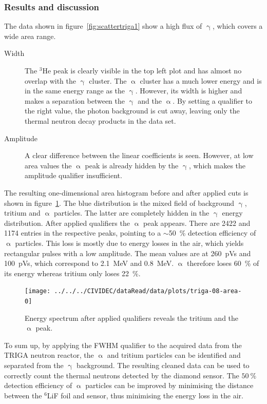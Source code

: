 \subsubsection{Results and discussion}
The data shown in figure~\ref{fig:scattertriga1} show a high flux of $\upgamma$, which covers a wide area range. 
\begin{description}
\item[Width] The $^3$He peak is clearly visible in the top left plot and has almost no overlap with the $\upgamma$ cluster. The $\upalpha$ cluster has a much lower energy and is in the same energy range as the $\upgamma$. However, its width is higher and makes a separation between the $\upgamma$ and the $\upalpha$. By setting a qualifier to the right value, the photon background is cut away, leaving only the thermal neutron decay products in the data set. 
\item[Amplitude] A clear difference between the linear coefficients is seen. However, at low area values the $\upalpha$ peak is already hidden by the $\upgamma$, which makes the amplitude qualifier insufficient.
\end{description}
The resulting one-dimensional area histogram before and after applied cuts is shown in figure~\ref{fig:areatriga0}. The blue distribution is the mixed field of background $\upgamma$, tritium and $\upalpha$ particles. The latter are completely hidden in the $\upgamma$ energy distribution. After applied qualifiers the $\upalpha$ peak appears. There are 2422 and 1174 entries in the respective peaks, pointing to a $\sim$50~\% detection efficiency of $\upalpha$ particles. This loss is mostly due to energy losses in the air, which yields rectangular pulses with a low amplitude. The mean values are at 260~pVs and 100~pVs, which correspond to 2.1~MeV and 0.8~MeV. $\upalpha$ therefore loses 60~\% of its energy whereas tritium only loses 22~\%.

\clearpage
\begin{figure}[!t]
\centering
\texttt{[image: ../../../CIVIDEC/dataRead/data/plots/triga-08-area-0]}
\caption{Energy spectrum after applied qualifiers reveals the tritium and the $\upalpha$ peak.}
\label{fig:areatriga0}
\end{figure}

To sum up, by applying the FWHM qualifier to the acquired data from the TRIGA neutron reactor, the $\upalpha$ and tritium particles can be identified and separated from the $\upgamma$ background. The resulting cleaned data can be used to correctly count the thermal neutrons detected by the diamond sensor. The $50~\%$ detection efficiency of $\upalpha$ particles can be improved by minimising the distance between the $^6$LiF foil and sensor, thus minimising the energy loss in the air.










